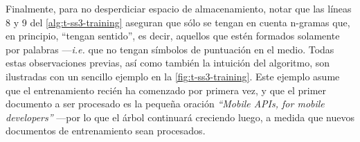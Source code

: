 Finalmente, para no desperdiciar espacio de almacenamiento, notar que las líneas 8 y 9 del \autoref{alg:t-ss3-training} aseguran que sólo se tengan en cuenta n-gramas que, en principio, ``tengan sentido'', es decir, aquellos que estén formados solamente por palabras ---\emph{i.e.} que no tengan símbolos de puntuación en el medio.
Todas estas observaciones previas, así como también la intuición del algoritmo, son ilustradas con un sencillo ejemplo en la \autoref{fig:t-ss3-training}.
Este ejemplo asume que el entrenamiento recién  ha comenzado por primera vez, y que el primer documento a ser procesado es la pequeña oración \emph{``Mobile APIs, for mobile developers''} 
---por lo que el árbol continuará creciendo luego, a medida que nuevos documentos de entrenamiento sean procesados.

